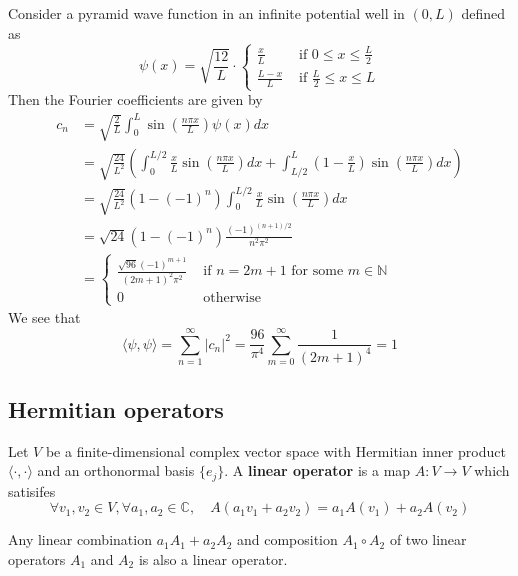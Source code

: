 \begin{example}
	Consider a pyramid wave function in an infinite potential well in $(0, L)$ defined as
	\[
		\psi(x) = \sqrt{\frac{12}{L}} \cdot \begin{cases}
			\frac{x}{L} & \text{ if } 0 \le x \le \frac{L}{2} \\
			\frac{L - x}{L} & \text{ if } \frac{L}{2} \le x \le L
		\end{cases}
	\]
	Then the Fourier coefficients are given by
	\[
		\begin{aligned}
			c_n
				& = \sqrt{\frac{2}{L}} \int_{0}^{L} \sin \left( \frac{n \pi x}{L} \right) \psi(x) dx \\
				& = \sqrt{\frac{24}{L^2}} \left( \int_{0}^{L / 2} \frac{x}{L} \sin \left( \frac{n \pi x}{L} \right) dx + \int_{L / 2}^{L} \left( 1 - \frac{x}{L} \right) \sin \left( \frac{n \pi x}{L} \right) dx \right) \\
				& = \sqrt{\frac{24}{L^2}} (1 - {(-1)}^n) \int_{0}^{L / 2} \frac{x}{L} \sin \left( \frac{n \pi x}{L} \right) dx \\
				& = \sqrt{24} (1 - {(-1)}^n) \frac{{(-1)}^{(n + 1)/2}}{n^2 \pi^2} \\
				& = \begin{cases}
					\frac{\sqrt{96} {(-1)}^{m + 1}}{{(2m + 1)}^2 \pi^2} & \text{ if } n = 2m + 1 \text{ for some } m \in \mathbb{N} \\
					0 & \text{ otherwise}
				\end{cases}
		\end{aligned}
	\]
	We see that
	\[
		\langle \psi, \psi \rangle = \sum_{n = 1}^{\infty} |c_n|^2 = \frac{96}{\pi^4} \sum_{m = 0}^{\infty} \frac{1}{{(2m + 1)}^4} = 1
	\]
\end{example}

\subsection{Hermitian operators}

\begin{definition}
	Let $V$ be a finite-dimensional complex vector space with Hermitian inner product $\langle \cdot, \cdot \rangle$ and an orthonormal basis $\{ e_j \}$. A \textbf{linear operator} is a map $A: V \rightarrow V$ which satisifes
	\[
		\forall v_1, v_2 \in V, \forall a_1, a_2 \in \mathbb{C}, \quad A (a_1 v_1 + a_2 v_2) = a_1 A(v_1) + a_2 A(v_2)
	\]
\end{definition}

\begin{remark}
	Any linear combination $a_1 A_1 + a_2 A_2$ and composition $A_1 \circ A_2$ of two linear operators $A_1$ and $A_2$ is also a linear operator.
\end{remark}

